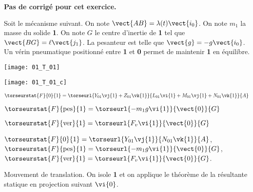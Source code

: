 \normaltrue
\correctiontrue


\setcounter{numques}{0}
\ifcorrection
\else
\textbf{Pas de corrigé pour cet exercice.}
\fi

\ifprof
\else
Soit le mécanisme suivant. On note $\vect{AB}=\lambda(t)\vect{i_0}$. On note $m_1$ la masse du solide \textbf{1}.
On note $G$ le centre d'inertie de \textbf{1} tel que $\vect{BG}=\ell \vect{j_1}$. La pesanteur est telle que $\vect{g}=-g\vect{i_0}$. Un vérin pneumatique positionné entre \textbf{1} et \textbf{0} permet de maintenir \textbf{1} en équilibre. 
\begin{center}
\texttt{[image: 01\_T\_01]}
\end{center}
\fi

\ifprof
\begin{center}
\texttt{[image: 01\_T\_01\_c]}
\end{center}
\else
\fi


\ifprof
$\torseurstat{F}{0}{1}=\torseurl{Y_{01}\vj{1}+Z_{01}\vk{1}}{L_{01}\vi{1}+M_{01}\vj{1}+N_{01}\vk{1}}{A}$

$\torseurstat{F}{\text{pes}}{1}=\torseurl{-m_1g\vi{1}}{\vect{0}}{G}$

$\torseurstat{F}{\text{ver}}{1}=\torseurl{F_v\vi{1}}{\vect{0}}{G}$
\else
\fi


\ifprof
$\torseurstat{F}{0}{1}=\torseurl{Y_{01}\vj{1}}{N_{01}\vk{1}}{A}$,
$\torseurstat{F}{\text{pes}}{1}=\torseurl{-m_1g\vi{1}}{\vect{0}}{G}$,
$\torseurstat{F}{\text{ver}}{1}=\torseurl{F_v\vi{1}}{\vect{0}}{G}$.
\else
\fi

\ifprof
Mouvement de translation. On isole \textbf{1} et on applique le théorème de la résultante statique en projection suivant $\vi{0}$.
\else
\fi



